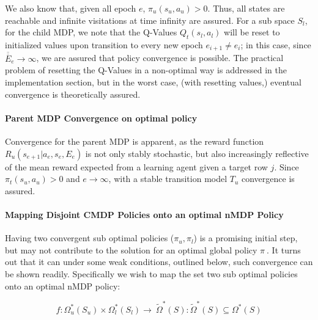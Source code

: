 \documentclass[compsoc,journal,letterpaper,10pt,draftclsnofoot,onecolumn]{IEEEtran}
\let\oldparagraph\paragraph
\renewcommand{\paragraph}[1]{\oldparagraph{#1}\mbox{}}
\begin{document}
We also know that, given all epoch \(e\),
\(\pi_{u}\left( s_{u},a_{u} \right) > 0\). Thus, all states are
reachable and infinite visitations at time infinity are assured. For a
sub space \(S_{l}\), for the child MDP, we note that the Q-Values
\(Q_{t}(s_{l},a_{l})\) will be reset to initialized values upon
transition to every new epoch \(e_{i + 1} \neq e_{i}\); in this case,
since \(\overline{\overline E}_{e} \rightarrow \infty\), we are assured that
policy convergence is possible. The practical problem of resetting the
Q-Values in a non-optimal way is addressed in the implementation
section, but in the worst case, (with resetting values,) eventual
convergence is theoretically assured.

\paragraph{Parent MDP Convergence on optimal
policy}\label{parent-mdp-convergence-on-optimal-policy}

Convergence for the parent MDP is apparent, as the reward function
\(R_{u}\left( s_{e + 1}|a_{e},s_{e},E_{e} \right)\) is not only stably
stochastic, but also increasingly reflective of the mean reward expected
from a learning agent given a target row \(j\). Since
\(\pi_{t}\left( s_{u},a_{u} \right) > 0\) and \(e \rightarrow \infty\),
with a stable transition model \(T_{u}\) convergence is assured.

\paragraph{Mapping Disjoint CMDP Policies onto an optimal nMDP
Policy}\label{mapping-disjoint-cmdp-policies-onto-an-optimal-nmdp-policy}

Having two convergent sub optimal policies (\(\pi_{u},\pi_{l}\)) is a
promising initial step, but may not contribute to the solution for an
optimal global policy \(\pi_{\ }.\) It turns out that it can under some
weak conditions, outlined below, such convergence can be shown readily.
Specifically we wish to map the set two sub optimal policies onto an
optimal nMDP policy:

\begin{equation}
f:\Omega_{u}^{*}\left( S_{u} \right) \times \Omega_{l}^{*}\left( S_{l} \right) \rightarrow \ {\tilde{\Omega}}^{*}\left( S \right):{\tilde{\Omega}}^{*}\left( S \right) \subseteq \Omega^{*}\left( S \right)
\end{equation}
 
\end{document}

